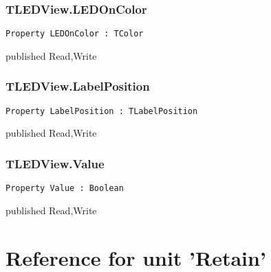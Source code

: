 \subsection{TLEDView.LEDOnColor}
\label{computer:ledview:tledview:ledoncolor}
\begin{FPCList}
\Declaration 

\begin{verbatim}
Property LEDOnColor : TColor
\end{verbatim}
\Visibility
published
\Access
Read,Write
\end{FPCList}
\subsection{TLEDView.LabelPosition}
\label{computer:ledview:tledview:labelposition}
\begin{FPCList}
\Declaration 

\begin{verbatim}
Property LabelPosition : TLabelPosition
\end{verbatim}
\Visibility
published
\Access
Read,Write
\end{FPCList}
\subsection{TLEDView.Value}
\label{computer:ledview:tledview:value}
\begin{FPCList}
\Declaration 

\begin{verbatim}
Property Value : Boolean
\end{verbatim}
\Visibility
published
\Access
Read,Write
\end{FPCList}
\chapter{Reference for unit 'Retain'}
\label{computer:retain}
